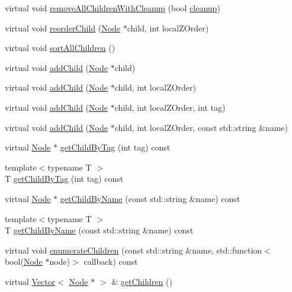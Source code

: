 \begin{DoxyCompactItemize}
\item 
virtual void \hyperlink{classNode_aca66e2b385c3dbf1a6f55627c4a13192}{remove\+All\+Children\+With\+Cleanup} (bool \hyperlink{classNode_aa2de84c6cdeec9cd647d236c30ee0567}{cleanup})
\item 
virtual void \hyperlink{classNode_a5c9bc72e7f53c1e7f0ef6bc87c07a08f}{reorder\+Child} (\hyperlink{classNode}{Node} $\ast$child, int local\+Z\+Order)
\item 
virtual void \hyperlink{classNode_adfaeea03013d3eae710c4d4d725bce0b}{sort\+All\+Children} ()
\item 
virtual void \hyperlink{classNode_aa3e5ddb38e23ee7763d623f2d943b004}{add\+Child} (\hyperlink{classNode}{Node} $\ast$child)
\item 
virtual void \hyperlink{classNode_a4fc01f017ee724751b48ec3c6fd60df3}{add\+Child} (\hyperlink{classNode}{Node} $\ast$child, int local\+Z\+Order)
\item 
virtual void \hyperlink{classNode_a6d30a9e718c1c12adf739cb1554c2ff7}{add\+Child} (\hyperlink{classNode}{Node} $\ast$child, int local\+Z\+Order, int tag)
\item 
virtual void \hyperlink{classNode_ae96fa155c63a5dc57e3fc89d5488c036}{add\+Child} (\hyperlink{classNode}{Node} $\ast$child, int local\+Z\+Order, const std\+::string \&name)
\item 
virtual \hyperlink{classNode}{Node} $\ast$ \hyperlink{classNode_ac2fa47ea7ec6663e4cfe0580da7131f5}{get\+Child\+By\+Tag} (int tag) const
\item 
{\footnotesize template$<$typename T $>$ }\\T \hyperlink{classNode_a093e82df91d1c2df7d55e5b1b319012b}{get\+Child\+By\+Tag} (int tag) const
\item 
virtual \hyperlink{classNode}{Node} $\ast$ \hyperlink{classNode_af00de78a02fd2112123857bbe053e163}{get\+Child\+By\+Name} (const std\+::string \&name) const
\item 
{\footnotesize template$<$typename T $>$ }\\T \hyperlink{classNode_abbd6d0f2c3d65db94ea75d16402f83a2}{get\+Child\+By\+Name} (const std\+::string \&name) const
\item 
virtual void \hyperlink{classNode_ada6f69bdf4cd0b241dc12935536f3dbe}{enumerate\+Children} (const std\+::string \&name, std\+::function$<$ bool(\hyperlink{classNode}{Node} $\ast$node)$>$ callback) const
\item 
virtual \hyperlink{classVector}{Vector}$<$ \hyperlink{classNode}{Node} $\ast$ $>$ \& \hyperlink{classNode_a25943a94b19e37929b18f93647b58153}{get\+Children} ()

\end{DoxyCompactItemize}
